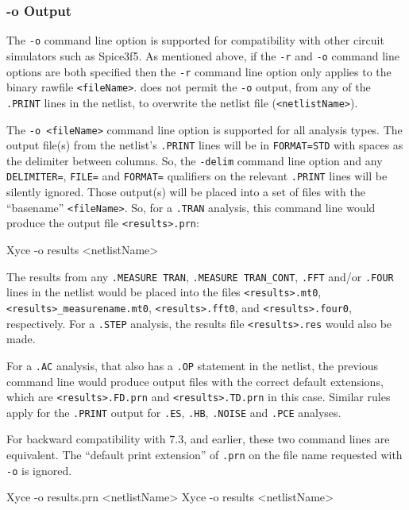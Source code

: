 {{\subsubsection{-o Output}
The \verb+-o+ command line option is supported for compatibility with other
circuit simulators such as Spice3f5.  As mentioned above, if the \verb+-r+ and 
\verb+-o+ command line options are both specified then the \verb+-r+ command
line option only applies to the binary rawfile \verb+<fileName>+.  \Xyce{}
does not permit the \verb+-o+ output, from any of the \texttt{.PRINT} lines
in the netlist, to overwrite the netlist file (\verb+<netlistName>+).  

The \verb+-o <fileName>+ command line option is supported for all analysis types.
The output file(s) from the netlist's \texttt{.PRINT} lines
will be in \texttt{FORMAT=STD} with spaces as the delimiter between columns.
So, the \verb+-delim+ command line option and any \texttt{DELIMITER=}, \texttt{FILE=}
and \texttt{FORMAT=} qualifiers on the relevant \texttt{.PRINT} lines will be
silently ignored.  Those output(s) will be placed into a set of files with the
``basename'' \verb+<fileName>+.  So, for a \texttt{.TRAN} analysis, this
command line would produce the output file \verb+<results>.prn+:
\begin{vquote}
   Xyce -o results <netlistName>
\end{vquote}

The results from any \texttt{.MEASURE TRAN}, \texttt{.MEASURE TRAN\_CONT},
\texttt{.FFT} and/or \texttt{.FOUR} lines in the netlist would be placed into
the files \verb+<results>.mt0+, \verb+<results>_measurename.mt0+,
\verb+<results>.fft0+, and \verb+<results>.four0+, respectively.  For a
\texttt{.STEP} analysis, the results file \verb+<results>.res+ would also be
made.

For a \texttt{.AC} analysis, that also has a \texttt{.OP} statement in the netlist,
the previous command line would produce output files with the correct default
extensions, which are \verb+<results>.FD.prn+ and \verb+<results>.TD.prn+ in this
case.  Similar rules apply for the \texttt{.PRINT} output for \texttt{.ES},
\texttt{.HB}, \texttt{.NOISE} and \texttt{.PCE} analyses.

For backward compatibility with \Xyce{} 7.3, and earlier, these two command lines
are equivalent.  The ``default print extension'' of  \verb+.prn+ on the file name
requested with \verb+-o+ is ignored.
\begin{vquote}
   Xyce -o results.prn <netlistName>
   Xyce -o results <netlistName>
\end{vquote}

}}
